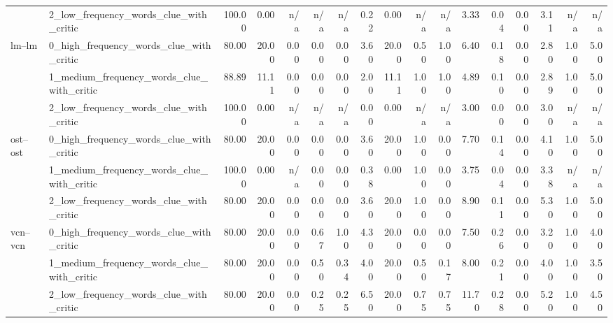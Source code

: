 \begin{tabular}{llrrrrrrrrrrrrrrr}
 & 2_low_frequency_words_clue_with_critic & 100.00 & 0.00 & n/a & n/a & n/a & 0.22 & 0.00 & n/a & n/a & 3.33 & 0.04 & 0.00 & 3.11 & n/a & n/a \\
\cline{1-17}
\multirow[t]{3}{*}{lm--lm} & 0_high_frequency_words_clue_with_critic & 80.00 & 20.00 & 0.00 & 0.00 & 0.00 & 3.60 & 20.00 & 0.50 & 1.00 & 6.40 & 0.18 & 0.00 & 2.80 & 1.00 & 5.00 \\
 & 1_medium_frequency_words_clue_with_critic & 88.89 & 11.11 & 0.00 & 0.00 & 0.00 & 2.00 & 11.11 & 1.00 & 1.00 & 4.89 & 0.10 & 0.00 & 2.89 & 1.00 & 5.00 \\
 & 2_low_frequency_words_clue_with_critic & 100.00 & 0.00 & n/a & n/a & n/a & 0.00 & 0.00 & n/a & n/a & 3.00 & 0.00 & 0.00 & 3.00 & n/a & n/a \\
\cline{1-17}
\multirow[t]{3}{*}{ost--ost} & 0_high_frequency_words_clue_with_critic & 80.00 & 20.00 & 0.00 & 0.00 & 0.00 & 3.60 & 20.00 & 1.00 & 0.00 & 7.70 & 0.14 & 0.00 & 4.10 & 1.00 & 5.00 \\
 & 1_medium_frequency_words_clue_with_critic & 100.00 & 0.00 & n/a & 0.00 & 0.00 & 0.38 & 0.00 & 1.00 & 0.00 & 3.75 & 0.04 & 0.00 & 3.38 & n/a & n/a \\
 & 2_low_frequency_words_clue_with_critic & 80.00 & 20.00 & 0.00 & 0.00 & 0.00 & 3.60 & 20.00 & 1.00 & 0.00 & 8.90 & 0.11 & 0.00 & 5.30 & 1.00 & 5.00 \\
\cline{1-17}
\multirow[t]{3}{*}{vcn--vcn} & 0_high_frequency_words_clue_with_critic & 80.00 & 20.00 & 0.00 & 0.67 & 1.00 & 4.30 & 20.00 & 0.00 & 0.00 & 7.50 & 0.26 & 0.00 & 3.20 & 1.00 & 4.00 \\
 & 1_medium_frequency_words_clue_with_critic & 80.00 & 20.00 & 0.00 & 0.50 & 0.34 & 4.00 & 20.00 & 0.50 & 0.17 & 8.00 & 0.21 & 0.00 & 4.00 & 1.00 & 3.50 \\
 & 2_low_frequency_words_clue_with_critic & 80.00 & 20.00 & 0.00 & 0.25 & 0.25 & 6.50 & 20.00 & 0.75 & 0.75 & 11.70 & 0.28 & 0.00 & 5.20 & 1.00 & 4.50 \\
\cline{1-17}
\bottomrule
\end{tabular}
